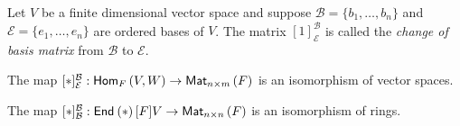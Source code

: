 \documentclass{memoir}
\begin{document}
\begin{dfn}
Let $V$ be a finite dimensional vector space and suppose $\mathcal{B} = \{b_1,\ldots,b_n\}$ and $\mathcal{E} = \{e_1,\ldots,e_n\}$ are ordered bases of $V$. The matrix $[1]^\mathcal{B}_\mathcal{E}$ is called the \emph{change of basis matrix} from $\mathcal{B}$ to $\mathcal{E}$.
\end{dfn}

\begin{prp} \mbox{}
\begin{enumerate*}
\item The map $[\ast]^\mathcal{B}_\mathcal{E} : \Hom[F]{V}{W} \rightarrow \Mat{n}{m}{F}$ is an isomorphism of vector spaces.
\item The map $[\ast]^\mathcal{B}_\mathcal{B} : \End*[F]{V} \rightarrow \Mat{n}{n}{F}$ is an isomorphism of rings.
\end{enumerate*}
\end{prp}
\end{document}
